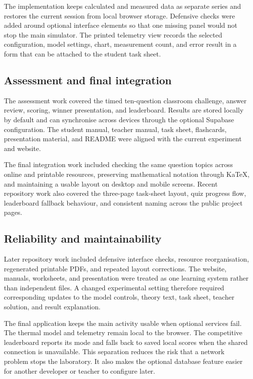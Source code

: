 \documentclass[10pt,conference,a4paper]{IEEEtran}
\begin{document}
The implementation keeps calculated and measured data as separate series and restores the current session from local browser storage. Defensive checks were added around optional interface elements so that one missing panel would not stop the main simulator. The printed telemetry view records the selected configuration, model settings, chart, measurement count, and error result in a form that can be attached to the student task sheet.

\subsection*{Assessment and final integration}

The assessment work covered the timed ten-question classroom challenge, answer review, scoring, winner presentation, and leaderboard. Results are stored locally by default and can synchronise across devices through the optional Supabase configuration. The student manual, teacher manual, task sheet, flashcards, presentation material, and README were aligned with the current experiment and website.

The final integration work included checking the same question topics across online and printable resources, preserving mathematical notation through KaTeX, and maintaining a usable layout on desktop and mobile screens. Recent repository work also covered the three-page task-sheet layout, quiz progress flow, leaderboard fallback behaviour, and consistent naming across the public project pages.

\subsection*{Reliability and maintainability}

Later repository work included defensive interface checks, resource reorganisation, regenerated printable PDFs, and repeated layout corrections. The website, manuals, worksheets, and presentation were treated as one learning system rather than independent files. A changed experimental setting therefore required corresponding updates to the model controls, theory text, task sheet, teacher solution, and result explanation.

The final application keeps the main activity usable when optional services fail. The thermal model and telemetry remain local to the browser. The competitive leaderboard reports its mode and falls back to saved local scores when the shared connection is unavailable. This separation reduces the risk that a network problem stops the laboratory. It also makes the optional database feature easier for another developer or teacher to configure later.
\end{document}
